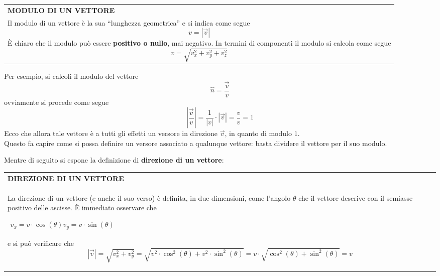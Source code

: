 \documentclass[a4paper]{extarticle}
\newcommand{\quotes}[1]{``#1''}
\renewcommand\arraystretch{}
\begin{document}
\vspace{1em}
\setlength{\tabcolsep}{14pt}
\renewcommand{\arraystretch}{2}
\noindent
\begin{tabularx}{\textwidth}{@{}|P|@{}}
    \hline
    {\textbf{MODULO DI UN VETTORE}}\\
    \parbox{\linewidth}{Il modulo di un vettore è la sua \quotes{lunghezza geometrica} e si indica come segue
    \[v = \left \vert \vec{v} \right \vert\]
    È chiaro che il modulo può essere \textbf{positivo o nullo}, mai negativo. In termini di componenti il modulo si calcola come segue
    \[v = \sqrt{v_x^2 + v_y^2 + v_z^2}\]
    \vspace{3mm}}\\
    \hline
\end{tabularx}

\vspace{1em}
\noindent
Per esempio, si calcoli il modulo del vettore
\[\hat{n} = \frac{\vec{v}}{v}\]
ovviamente si procede come segue
\[\left \vert \frac{\vec{v}}{v} \right \vert = \frac{1}{\left \vert v \right \vert} \cdot \left \vert \vec{v} \right \vert = \frac{v}{v} = 1\]
Ecco che allora tale vettore è a tutti gli effetti un versore in direzione $\vec{v}$, in quanto di modulo $1$.\\
Questo fa capire come si possa definire un versore associato a qualunque vettore: basta dividere il vettore per il suo modulo.

\vspace{1em}
\noindent
Mentre di seguito si espone la definizione di \textbf{direzione di un vettore}:

\vspace{1em}
\setlength{\tabcolsep}{14pt}
\renewcommand{\arraystretch}{2}
\noindent
\begin{tabularx}{\textwidth}{@{}|P|@{}}
    \hline
    {\textbf{DIREZIONE DI UN VETTORE}}\\
    \parbox{\linewidth}{La direzione di un vettore (e anche il suo verso) è definita, in due dimensioni, come l'angolo $\theta$ che il vettore descrive con il semiasse positivo delle ascisse.\\
    È immediato osservare che
    \begin{center}
      $\begin{array}{c}
        v_x = v \cdot \cos(\theta)\\
        v_y = v \cdot \sin(\theta)
      \end{array}$
    \end{center}
    e si può verificare che
    \[\left \vert \vec{v} \right \vert = \sqrt{v_x^2 + v_y^2} = \sqrt{v^2 \cdot \cos^2(\theta) + v^2 \cdot \sin^2(\theta)} = v \cdot \sqrt{\cos^2(\theta) + \sin^2(\theta)} = v\]
    \vspace{-1mm}}\\
    \hline
\end{tabularx}
\end{document}
